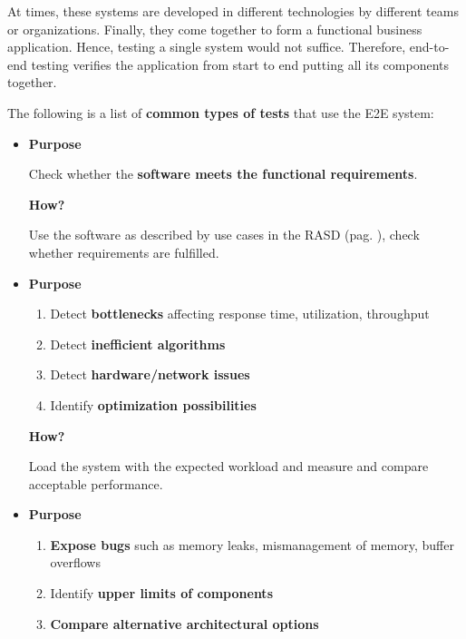 \noindent
At times, these systems are developed in different technologies by different teams or organizations. Finally, they come together to form a functional business application. Hence, testing a single system would not suffice. Therefore, end-to-end testing verifies the application from start to end putting all its components together.

\highspace
The following is a list of \textbf{common types of tests} that use the E2E system:
\begin{itemize}
    \item {}
    \begin{flushleft}
        \textcolor{Red2}{ \textbf{Purpose}}
    \end{flushleft}
    Check whether the \textbf{software meets the functional requirements}.

    \begin{flushleft}
        \textcolor{Green3}{ \textbf{How?}}
    \end{flushleft}
    Use the software as described by use cases in the RASD (pag. \pageref{RASD}), check whether requirements are fulfilled.


    \item {}
    \begin{flushleft}
        \textcolor{Red2}{ \textbf{Purpose}}
    \end{flushleft}
    \begin{enumerate}
        \item Detect \textbf{bottlenecks} affecting response time, utilization, throughput
        \item Detect \textbf{inefficient algorithms}
        \item Detect \textbf{hardware/network issues}
        \item Identify \textbf{optimization possibilities}
    \end{enumerate}

    \begin{flushleft}
        \textcolor{Green3}{ \textbf{How?}}
    \end{flushleft}
    Load the system with the expected workload and measure and compare acceptable performance.
    
    \newpage

    \item {}
    \begin{flushleft}
        \textcolor{Red2}{ \textbf{Purpose}}
    \end{flushleft}
    \begin{enumerate}
        \item \textbf{Expose bugs} such as memory leaks, mismanagement of memory, buffer overflows
        \item Identify \textbf{upper limits of components}
        \item \textbf{Compare alternative architectural options}
    \end{enumerate}


\end{itemize}
